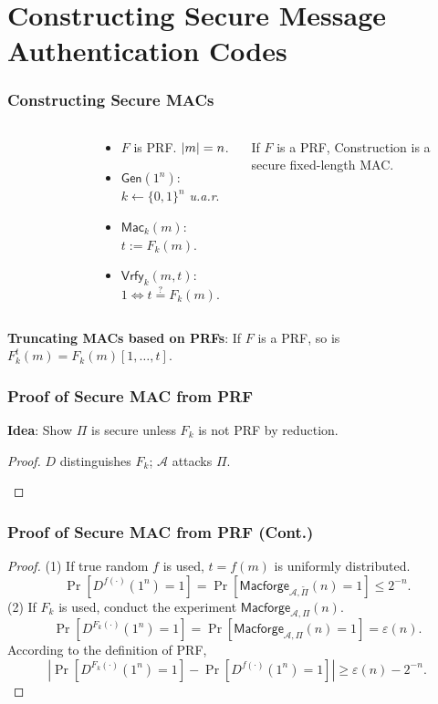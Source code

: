 \section{Constructing Secure Message Authentication Codes}
\begin{frame}\frametitle{Constructing Secure MACs}
\begin{columns}[c]
\begin{figure}
\begin{center}

\end{center}
\end{figure}
\begin{construction}
\begin{itemize}
\item $F$ is PRF. $\lvert m\rvert = n$.
\item $\mathsf{Gen}(1^n)$: $k \gets \{0,1\}^n$ \emph{u.a.r}.
\item $\mathsf{Mac}_k(m)$: $t := F_k(m)$.
\item $\mathsf{Vrfy}_k(m,t)$: $1 \iff t \overset{?}{=} F_k(m)$.
\end{itemize}
\end{construction}
\begin{theorem}\label{thm:mac}
If $F$ is a PRF, Construction is a secure fixed-length MAC.
\end{theorem}
\end{columns}
\begin{lemma}
\textbf{Truncating MACs based on PRFs}:
If $F$ is a PRF, so is $F^t_k(m) = F_k(m)[1,\dots,t]$.
\end{lemma}
\end{frame}
\begin{frame}\frametitle{Proof of Secure MAC from PRF}
\textbf{Idea}: Show $\Pi$ is secure unless $F_k$ is not PRF by reduction.  
\begin{proof}
$D$ distinguishes $F_k$; $\mathcal{A}$ attacks $\Pi$. 
\begin{figure}
\begin{center}

\end{center}
\end{figure}
\end{proof}
\end{frame}
\begin{frame}\frametitle{Proof of Secure MAC from PRF (Cont.)}
\begin{proof}
(1) If true random $f$ is used, $t=f(m)$ is uniformly distributed.
\[ \Pr[D^{f(\cdot)}(1^n)=1] = \Pr[\mathsf{Macforge}_{\mathcal{A},\tilde{\Pi}}(n) = 1] \le 2^{-n}.\]
(2) If $F_k$ is used, conduct the experiment $\mathsf{Macforge}_{\mathcal{A},\Pi}(n)$. 
\[ \Pr[D^{F_k(\cdot)}(1^n)=1] = \Pr[\mathsf{Macforge}_{\mathcal{A},\Pi}(n) = 1] = \varepsilon(n).\]
According to the definition of PRF,
\[ \left| \Pr[D^{F_k(\cdot)}(1^n)=1] - \Pr[D^{f(\cdot)}(1^n)=1] \right| \ge \varepsilon(n) - 2^{-n}. \]
\end{proof}
\end{frame}
